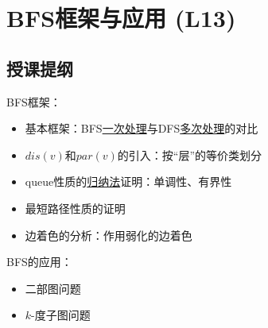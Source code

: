 \chapter{BFS框架与应用 (L13)}

\section*{授课提纲}

\nid BFS框架：
\begin{itemize}
    \item 基本框架：BFS\ul{一次处理}与DFS\ul{多次处理}的对比
    \item $dis(v)$和$par(v)$的引入：按“层”的等价类划分
    \item queue性质的\ul{归纳法}证明：单调性、有界性
    \item 最短路径性质的证明
    \item 边着色的分析：作用弱化的边着色
\end{itemize}

\nid BFS的应用：
\begin{itemize}
    \item 二部图问题
    \item $k$-度子图问题
\end{itemize}

